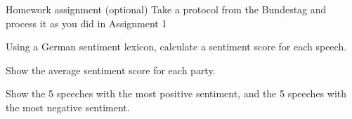 \documentclass[
  10pt,
  ignorenonframetext,
  aspectratio=169]{beamer}
\newif\ifbibliography
\begin{document}
\begin{frame}{Homework assignment (optional)}
\protect\hypertarget{homework-assignment-optional}{}
Take a protocol from the Bundestag and process it as you did in
Assignment 1

Using a German sentiment lexicon, calculate a sentiment score for each
speech.

Show the average sentiment score for each party.

Show the 5 speeches with the most positive sentiment, and the 5 speeches
with the most negative sentiment.
\end{frame}

\begin{frame}[allowframebreaks]{}
  \bibliographytrue
  
\end{frame}
\end{document}
